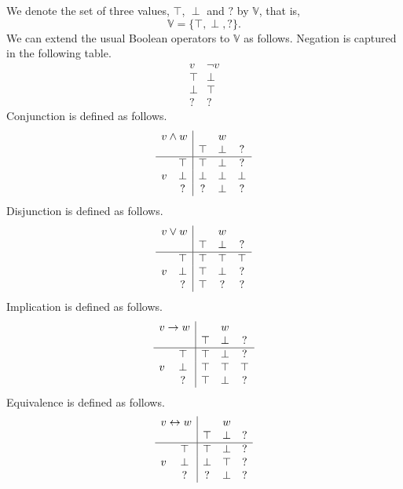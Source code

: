 \documentclass[12pt]{article}
\theoremstyle{definition}
\begin{document}
We denote the set of three values, $\top$, $\perp$ and $?$ by $\mathbb{V}$, that is,
\[
\mathbb{V} = \{ \top, \perp, \mathord{?} \}.
\]
We can extend the usual Boolean operators to $\mathbb{V}$ as follows.  Negation is captured in the following table.
\[
\begin{array}{c|c}
v & \neg v\\\hline
\top & \perp\\
\perp & \top\\
\mathord{?} & \mathord{?}
\end{array}
\]
Conjunction is defined as follows.
\[
\begin{array}{cc|ccc}
\multicolumn{2}{c|}{v \wedge w} & & w &\\
&& \top & \perp & \mathord{?}\\\hline
& \top & \top & \perp & \mathord{?}\\
v & \perp & \perp & \perp & \perp\\
& \mathord{?} & \mathord{?} & \perp & \mathord{?}
\end{array}
\]
Disjunction is defined as follows.
\[
\begin{array}{cc|ccc}
\multicolumn{2}{c|}{v \vee w} & & w &\\
&& \top & \perp & \mathord{?}\\\hline
& \top & \top & \top & \top\\
v & \perp & \top & \perp & \mathord{?}\\
& \mathord{?} & \top & \mathord{?} & \mathord{?}
\end{array}
\]
Implication is defined as follows.
\[
\begin{array}{cc|ccc}
\multicolumn{2}{c|}{v \rightarrow w} & & w &\\
&& \top & \perp & \mathord{?}\\\hline
& \top & \top & \perp & ?\\
v & \perp & \top & \top & \top\\
& \mathord{?} & \top & \perp & ?
\end{array}
\]
Equivalence is defined as follows.
\[
\begin{array}{cc|ccc}
\multicolumn{2}{c|}{v \leftrightarrow w} & & w &\\
&& \top & \perp & \mathord{?}\\\hline
& \top & \top & \perp & ?\\
v & \perp & \perp & \top & ?\\
& \mathord{?} & ? & \perp & ?
\end{array}
\]
\end{document}
